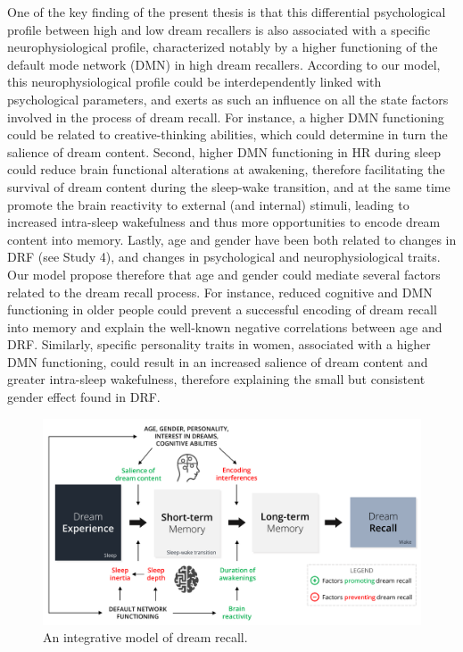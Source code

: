 One of the key finding of the present thesis is that this differential psychological profile between high and low dream recallers is also associated with a specific neurophysiological profile, characterized notably by a higher functioning of the default mode network (DMN) in high dream recallers. According to our model, this neurophysiological profile could be interdependently linked with psychological parameters, and exerts as such an influence on all the state factors involved in the process of dream recall. For instance, a higher DMN functioning could be related to creative-thinking abilities, which could determine in turn the salience of dream content. Second, higher DMN functioning in HR during sleep could reduce brain functional alterations at awakening, therefore facilitating the survival of dream content during the sleep-wake transition, and at the same time promote the brain reactivity to external (and internal) stimuli, leading to increased intra-sleep wakefulness and thus more opportunities to encode dream content into memory. Lastly, age and gender have been both related to changes in DRF (see Study 4), and changes in psychological and neurophysiological traits. Our model propose therefore that age and gender could mediate several factors related to the dream recall process. For instance, reduced cognitive and DMN functioning in older people could prevent a successful encoding of dream recall into memory and explain the well-known negative correlations between age and DRF. Similarly, specific personality traits in women, associated with a higher DMN functioning, could result in an increased salience of dream content and greater intra-sleep wakefulness, therefore explaining the small but consistent gender effect found in DRF.

\begin{figure}[!htbp]
	\includegraphics[width=\textwidth]{Fig/Discussion/schema_dream_recall.png}
	\caption[An integrative model of dream recall]{An integrative model of dream recall.}
	\label{fig:disc:drf:model}
\end{figure}

